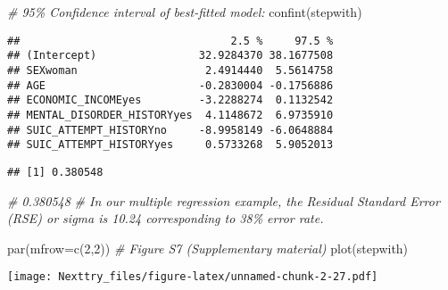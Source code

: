 \documentclass[
]{book}
\newenvironment{Shaded}{\begin{snugshade}}{\end{snugshade}}
\newcommand{\AttributeTok}[1]{\textcolor[rgb]{0.77,0.63,0.00}{#1}}
\newcommand{\CommentTok}[1]{\textcolor[rgb]{0.56,0.35,0.01}{\textit{#1}}}
\newcommand{\DecValTok}[1]{\textcolor[rgb]{0.00,0.00,0.81}{#1}}
\newcommand{\FunctionTok}[1]{\textcolor[rgb]{0.00,0.00,0.00}{#1}}
\newcommand{\NormalTok}[1]{#1}
\newcommand{\SpecialCharTok}[1]{\textcolor[rgb]{0.00,0.00,0.00}{#1}}
\begin{document}
\begin{Shaded}
\begin{Highlighting}[]
\CommentTok{\# 95\% Confidence interval of best{-}fitted model:}
\FunctionTok{confint}\NormalTok{(stepwith)}
\end{Highlighting}
\end{Shaded}

\begin{verbatim}
##                                 2.5 %     97.5 %
## (Intercept)                32.9284370 38.1677508
## SEXwoman                    2.4914440  5.5614758
## AGE                        -0.2830004 -0.1756886
## ECONOMIC_INCOMEyes         -3.2288274  0.1132542
## MENTAL_DISORDER_HISTORYyes  4.1148672  6.9735910
## SUIC_ATTEMPT_HISTORYno     -8.9958149 -6.0648884
## SUIC_ATTEMPT_HISTORYyes     0.5733268  5.9052013
\end{verbatim}

\begin{Shaded}
\end{Shaded}

\begin{verbatim}
## [1] 0.380548
\end{verbatim}

\begin{Shaded}
\begin{Highlighting}[]
\CommentTok{\# 0.380548}
\CommentTok{\# In our multiple regression example, the Residual Standard Error (RSE) or sigma is 10.24 corresponding to 38\% error rate.}

\FunctionTok{par}\NormalTok{(}\AttributeTok{mfrow=}\FunctionTok{c}\NormalTok{(}\DecValTok{2}\NormalTok{,}\DecValTok{2}\NormalTok{))}
\CommentTok{\# Figure S7 (Supplementary material)}
\FunctionTok{plot}\NormalTok{(stepwith)}
\end{Highlighting}
\end{Shaded}

\texttt{[image: Nexttry\_files/figure-latex/unnamed-chunk-2-27.pdf]}
\end{document}
